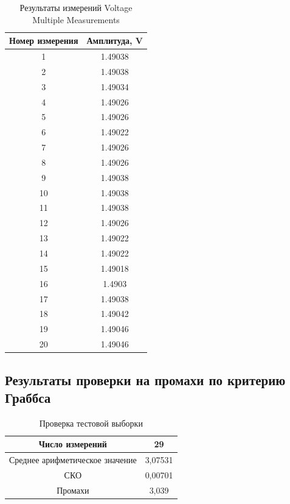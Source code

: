 \documentclass[a4paper,14pt]{article}
\begin{document}
\begin{table}[H]
	\centering
	\caption{Результаты измерений Voltage Multiple Measurements}
	\label{tab:vmm}
	\begin{tabular}{|c|c|}
		\hline
		Номер измерения & Амплитуда, V \\ \hline
		1               & 1.49038      \\ \hline
		2               & 1.49038      \\ \hline
		3               & 1.49034      \\ \hline
		4               & 1.49026      \\ \hline
		5               & 1.49026      \\ \hline
		6               & 1.49022      \\ \hline
		7               & 1.49026      \\ \hline
		8               & 1.49026      \\ \hline
		9               & 1.49038      \\ \hline
		10              & 1.49038      \\ \hline
		11              & 1.49038      \\ \hline
		12              & 1.49026      \\ \hline
		13              & 1.49022      \\ \hline
		14              & 1.49022      \\ \hline
		15              & 1.49018      \\ \hline
		16              & 1.4903       \\ \hline
		17              & 1.49038      \\ \hline
		18              & 1.49042      \\ \hline
		19              & 1.49046      \\ \hline
		20              & 1.49046      \\ \hline
	\end{tabular}
\end{table}

\subsection{Результаты проверки на промахи по критерию Граббса}

\begin{table}[H]
	\centering
	\caption{Проверка тестовой выборки}
	\label{tab:grubbs_test}
	\begin{tabular}{|c|c|}
		\hline
		Число измерений                 & 29      \\ \hline
		Среднее арифметическое значение & 3,07531 \\ \hline
		СКО                             & 0,00701 \\ \hline
		Промахи                         & 3,039   \\ \hline
	\end{tabular}
\end{table}
\end{document}
